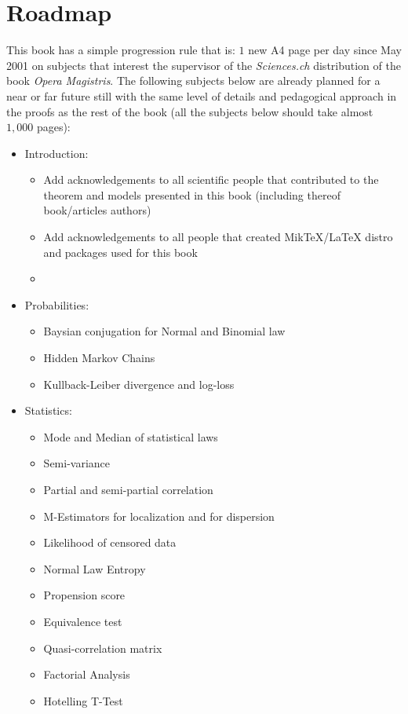 	\section{Roadmap}
	This book has a simple progression rule that is: $1$ new A4 page per day since May 2001 on subjects that interest the supervisor of the \textit{Sciences.ch} distribution of the book \textit{Opera Magistris}. The following subjects below are already planned for a near or far future still with the same level of details and pedagogical approach in the proofs as the rest of the book (all the subjects below should take almost $1,000$ pages):
	\begin{itemize}
		\item Introduction:
			\begin{itemize}
				\item Add acknowledgements to all scientific people that contributed to the theorem and models presented in this book (including thereof book/articles authors)
				\item Add acknowledgements to all people that created MikTeX/LaTeX distro and packages used for this book
				\item
			\end{itemize}
		\item Probabilities:
			\begin{itemize}
				\item Baysian conjugation for Normal and Binomial law
				\item Hidden Markov Chains
				\item Kullback-Leiber divergence and log-loss
			\end{itemize}
		\item Statistics: 
			\begin{itemize}
				\item Mode and Median of statistical laws				
				\item Semi-variance	
				\item Partial and semi-partial correlation
				\item M-Estimators for localization and for dispersion
				\item Likelihood of censored data
				\item Normal Law Entropy
				\item Propension score
				\item Equivalence test
				\item Quasi-correlation matrix
				\item Factorial Analysis
				\item Hotelling T-Test

\end{itemize}
\end{itemize}
